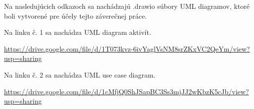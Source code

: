 Na nasledujúcich odkazoch sa nachádzajú .drawio súbory UML diagramov, ktoré boli vytvorené pre účely tejto záverečnej práce.

Na linku č. 1 sa nachádza UML diagram aktivít.

\url{https://drive.google.com/file/d/1T073kvz-6ivYaglVsNM8srZKxVC2QeYm/view?usp=sharing}

Na linku č. 2 sa nachádza UML use case diagram.

\url{https://drive.google.com/file/d/1cMfjQ0ShJSapBC3Ss3mjJJ2wKbzK5cJb/view?usp=sharing}